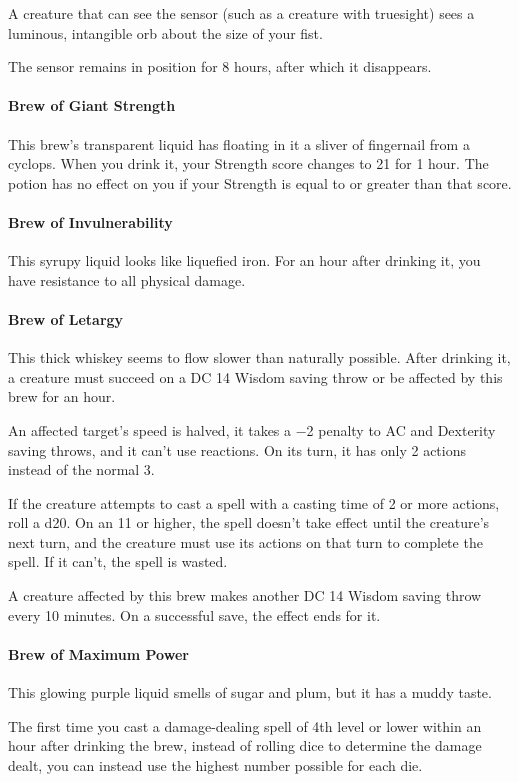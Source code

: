     A creature that can see the sensor (such as a creature with truesight) sees a luminous, intangible orb about the size of your fist.

    The sensor remains in position for 8 hours, after which it disappears.
\paragraph{Brew of Giant Strength}
    This brew's transparent liquid has floating in it a sliver of fingernail from a cyclops.
    When you drink it, your Strength score changes to 21 for 1 hour.
    The potion has no effect on you if your Strength is equal to or greater than that score.
\paragraph{Brew of Invulnerability}
    This syrupy liquid looks like liquefied iron.
    For an hour after drinking it, you have resistance to all physical damage.
\paragraph{Brew of Letargy} %
    This thick whiskey seems to flow slower than naturally possible.
    After drinking it, a creature must succeed on a DC 14 Wisdom saving throw or be affected by this brew for an hour.

    An affected target's speed is halved, it takes a −2 penalty to AC and Dexterity saving throws, and it can't use reactions.
    On its turn, it has only 2 actions instead of the normal 3.

    If the creature attempts to cast a spell with a casting time of 2 or more actions, roll a d20.
    On an 11 or higher, the spell doesn't take effect until the creature's next turn, and the creature must use its actions on that turn to complete the spell.
    If it can't, the spell is wasted.

    A creature affected by this brew makes another DC 14 Wisdom saving throw every 10 minutes.
    On a successful save, the effect ends for it.
\paragraph{Brew of Maximum Power}
    This glowing purple liquid smells of sugar and plum, but it has a muddy taste.

    The first time you cast a damage-dealing spell of 4th level or lower within an hour after drinking the brew, instead of rolling dice to determine the damage dealt, you can instead use the highest number possible for each die.
